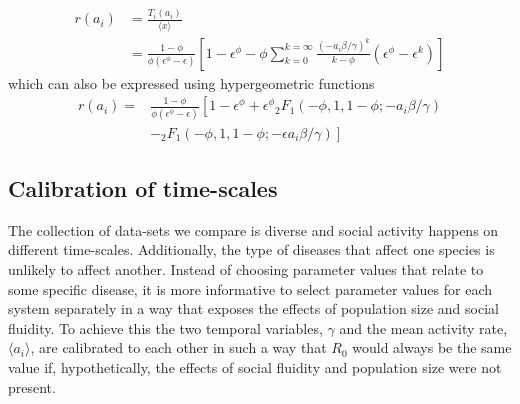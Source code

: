 \documentclass[10pt]{article}
\begin{document}
\begin{multicols}{2}
\begin{equation}
\label{r_i}
\begin{split}
r(a_{i})&=\frac{T_{i}(a_{i})}{\langle x \rangle}\\
&=\frac{1-\phi}{\phi(\epsilon^{\phi}-\epsilon)}\left[1-\epsilon^{\phi}-\phi\sum_{k=0}^{k=\infty}\frac{(-a_{i}\beta/\gamma)^{k}}{k-\phi}(\epsilon^{\phi}-\epsilon^{k})\right]
\end{split}
\end{equation}
which can also be expressed using hypergeometric functions
\begin{equation}
\label{with_N}
\begin{split}
r(a_{i})=&\frac{1-\phi}{\phi(\epsilon^{\phi}-\epsilon)}\left[1-\epsilon^{\phi}+\epsilon^{\phi}{}_{2}F_{1}(-\phi,1,1-\phi;-a_{i}\beta/\gamma)\right.\\
&\left.-{}_{2}F_{1}(-\phi,1,1-\phi;-\epsilon a_{i}\beta/\gamma)\right]
\end{split}
\end{equation}
\subsection{Calibration of time-scales}
The collection of data-sets we compare is diverse and social activity happens on different time-scales. Additionally, the type of diseases that affect one species is unlikely to affect another. Instead of choosing parameter values that relate to some specific disease, it is more informative to select parameter values for each system separately in a way that exposes the effects of population size and social fluidity. To achieve this the two temporal variables, $\gamma$ and the mean activity rate, $\langle a_{i}\rangle$, are calibrated to each other in such a way that $R_{0}$ would always be the same value if, hypothetically, the effects of social fluidity and population size were not present.


\end{multicols}
\end{document}
